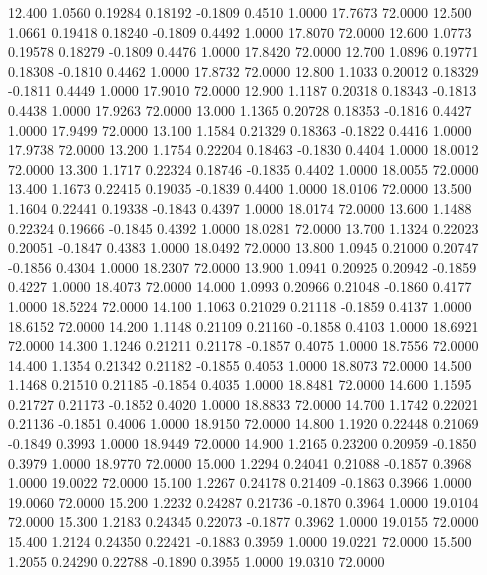   12.400   1.0560   0.19284   0.18192  -0.1809   0.4510   1.0000  17.7673  72.0000
  12.500   1.0661   0.19418   0.18240  -0.1809   0.4492   1.0000  17.8070  72.0000
  12.600   1.0773   0.19578   0.18279  -0.1809   0.4476   1.0000  17.8420  72.0000
  12.700   1.0896   0.19771   0.18308  -0.1810   0.4462   1.0000  17.8732  72.0000
  12.800   1.1033   0.20012   0.18329  -0.1811   0.4449   1.0000  17.9010  72.0000
  12.900   1.1187   0.20318   0.18343  -0.1813   0.4438   1.0000  17.9263  72.0000
  13.000   1.1365   0.20728   0.18353  -0.1816   0.4427   1.0000  17.9499  72.0000
  13.100   1.1584   0.21329   0.18363  -0.1822   0.4416   1.0000  17.9738  72.0000
  13.200   1.1754   0.22204   0.18463  -0.1830   0.4404   1.0000  18.0012  72.0000
  13.300   1.1717   0.22324   0.18746  -0.1835   0.4402   1.0000  18.0055  72.0000
  13.400   1.1673   0.22415   0.19035  -0.1839   0.4400   1.0000  18.0106  72.0000
  13.500   1.1604   0.22441   0.19338  -0.1843   0.4397   1.0000  18.0174  72.0000
  13.600   1.1488   0.22324   0.19666  -0.1845   0.4392   1.0000  18.0281  72.0000
  13.700   1.1324   0.22023   0.20051  -0.1847   0.4383   1.0000  18.0492  72.0000
  13.800   1.0945   0.21000   0.20747  -0.1856   0.4304   1.0000  18.2307  72.0000
  13.900   1.0941   0.20925   0.20942  -0.1859   0.4227   1.0000  18.4073  72.0000
  14.000   1.0993   0.20966   0.21048  -0.1860   0.4177   1.0000  18.5224  72.0000
  14.100   1.1063   0.21029   0.21118  -0.1859   0.4137   1.0000  18.6152  72.0000
  14.200   1.1148   0.21109   0.21160  -0.1858   0.4103   1.0000  18.6921  72.0000
  14.300   1.1246   0.21211   0.21178  -0.1857   0.4075   1.0000  18.7556  72.0000
  14.400   1.1354   0.21342   0.21182  -0.1855   0.4053   1.0000  18.8073  72.0000
  14.500   1.1468   0.21510   0.21185  -0.1854   0.4035   1.0000  18.8481  72.0000
  14.600   1.1595   0.21727   0.21173  -0.1852   0.4020   1.0000  18.8833  72.0000
  14.700   1.1742   0.22021   0.21136  -0.1851   0.4006   1.0000  18.9150  72.0000
  14.800   1.1920   0.22448   0.21069  -0.1849   0.3993   1.0000  18.9449  72.0000
  14.900   1.2165   0.23200   0.20959  -0.1850   0.3979   1.0000  18.9770  72.0000
  15.000   1.2294   0.24041   0.21088  -0.1857   0.3968   1.0000  19.0022  72.0000
  15.100   1.2267   0.24178   0.21409  -0.1863   0.3966   1.0000  19.0060  72.0000
  15.200   1.2232   0.24287   0.21736  -0.1870   0.3964   1.0000  19.0104  72.0000
  15.300   1.2183   0.24345   0.22073  -0.1877   0.3962   1.0000  19.0155  72.0000
  15.400   1.2124   0.24350   0.22421  -0.1883   0.3959   1.0000  19.0221  72.0000
  15.500   1.2055   0.24290   0.22788  -0.1890   0.3955   1.0000  19.0310  72.0000
